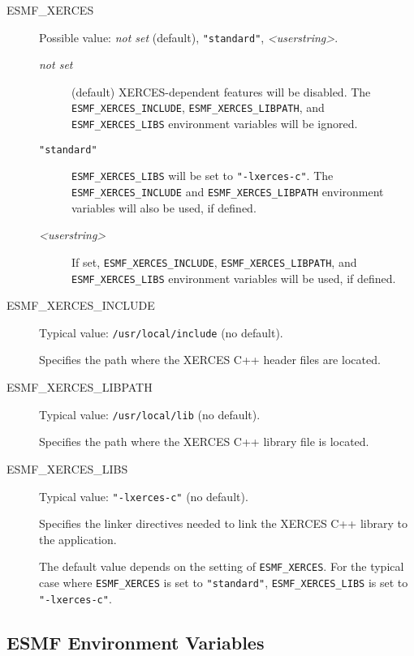 \begin{description}

\item[ESMF\_XERCES] Possible value: {\it not set} (default), {\tt "standard"}, 
{\it <userstring>}.

\begin{description}
\item[{\it not set}] (default) XERCES-dependent features will be disabled.
The {\tt ESMF\_XERCES\_INCLUDE}, {\tt ESMF\_XERCES\_LIBPATH}, and
{\tt ESMF\_XERCES\_LIBS} environment variables will be ignored.

\item[{\tt "standard"}] {\tt ESMF\_XERCES\_LIBS} will be set to 
{\tt "-lxerces-c"}.  The {\tt ESMF\_XERCES\_INCLUDE} and 
{\tt ESMF\_XERCES\_LIBPATH} environment variables will also be used, 
if defined.

\item[{\it <userstring>}] If set, {\tt ESMF\_XERCES\_INCLUDE}, 
{\tt ESMF\_XERCES\_LIBPATH}, and {\tt ESMF\_XERCES\_LIBS} environment 
variables will be used, if defined.
\end{description}

\item[ESMF\_XERCES\_INCLUDE] Typical value: {\tt /usr/local/include} 
(no default).

Specifies the path where the XERCES C++ header files are located.

\item[ESMF\_XERCES\_LIBPATH] Typical value: {\tt /usr/local/lib} (no default).

Specifies the path where the XERCES C++ library file is located.

\item[ESMF\_XERCES\_LIBS] Typical value: {\tt "-lxerces-c"} (no default).

Specifies the linker directives needed to link the XERCES C++ library to
the application.

The default value depends on the setting of {\tt ESMF\_XERCES}.  For the
typical case where {\tt ESMF\_XERCES} is set to {\tt "standard"}, 
{\tt ESMF\_XERCES\_LIBS} is set to {\tt "-lxerces-c"}. 
\end{description}


\subsection{ESMF Environment Variables}
\label{EnvironmentVariables}

